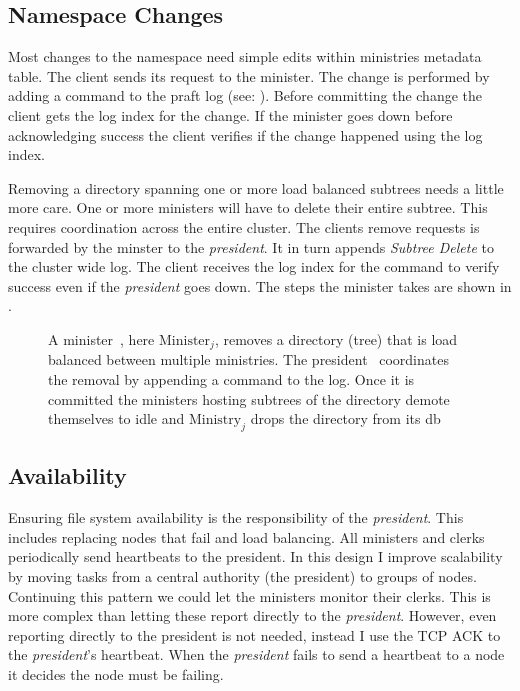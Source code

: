 \subsection*{Namespace Changes}
Most changes to the namespace need simple edits within ministries metadata table. The client sends its request to the minister. The change is performed by adding a command to the \ac{praft} log (see: ). Before committing the change the client gets the log index for the change. If the minister goes down before acknowledging success the client verifies if the change happened using the log index.

Removing a directory spanning one or more load balanced subtrees needs a little more care. One or more ministers will have to delete their entire subtree. This requires coordination across the entire cluster. The clients remove requests is forwarded by the minster to the \textit{president}. It in turn appends \textsl{Subtree Delete} to the cluster wide log. The client receives the log index for the command to verify success even if the \textit{president} goes down. The steps the minister takes are shown in . 
%
\begin{figure}[htbp]
	\centering
	
	\caption{A minister~\amdsLeg{}, here $\text{Minister}_j$, removes a directory (tree) that is load balanced between multiple ministries. The president~\presidentLeg{} coordinates the removal by appending a command to the log. Once it is committed the ministers hosting subtrees of the directory demote themselves to idle and $\text{Ministry}_j$ drops the directory from its db}
	\label{fig:rm}
\end{figure}
%
\subsection{Availability}
Ensuring file system availability is the responsibility of the \textit{president}. This includes replacing nodes that fail and load balancing. All ministers and clerks periodically send heartbeats to the president. In this design I improve scalability by moving tasks from a central authority (the president) to groups of nodes. Continuing this pattern we could let the ministers monitor their clerks. This is more complex than letting these report directly to the \textit{president}. However, even reporting directly to the president is not needed, instead I use the TCP ACK to the \textit{president}'s \raft{} heartbeat. When the \textit{president} fails to send a \raft{} heartbeat to a node it decides the node must be failing.

